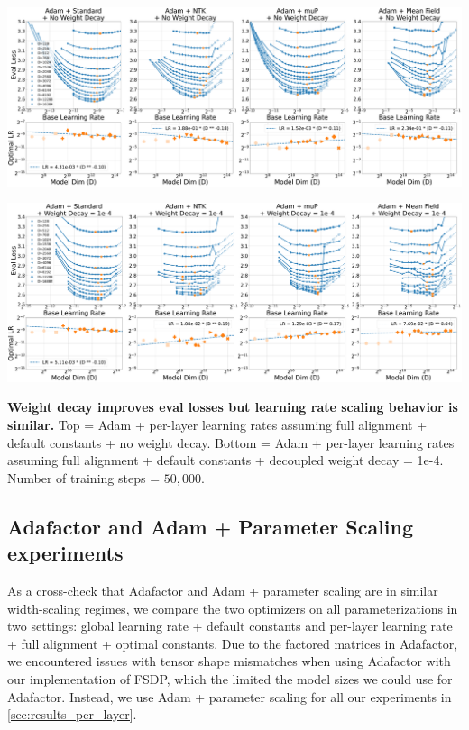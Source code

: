 \clearpage
\thispagestyle{plain}
\begin{SidewaysFigure}
        \includegraphics[width=\linewidth]{icml2024/figures/wd_appendix/adam+50k_steps_per_module_lr.pdf}
        
        \figvspace
        
        \includegraphics[width=\linewidth]{icml2024/figures/wd_appendix/adam+50k_steps_per_module_lr_wd.pdf}
        \caption{\textbf{Weight decay improves eval losses but learning rate scaling behavior is similar.} Top = Adam + per-layer learning rates assuming full alignment + default constants + no weight decay. Bottom = Adam + per-layer learning rates assuming full alignment + default constants + decoupled weight decay = 1e-4. Number of training steps = $50{,}000$.}
        \label{fig:appendix_adam_weight_decay}
\end{SidewaysFigure}
\clearpage

        
        

\subsection{Adafactor and Adam + Parameter Scaling experiments}
\label{app:adafactor_adam_ps}
As a cross-check that Adafactor and Adam + parameter scaling are in similar width-scaling regimes, we compare the two optimizers on all parameterizations in two settings: global learning rate + default constants and per-layer learning rate + full alignment + optimal constants. Due to the factored matrices in Adafactor, we encountered issues with tensor shape mismatches when using Adafactor with our implementation of FSDP, which the limited the model sizes we could use for Adafactor. Instead, we use Adam + parameter scaling for all our experiments in \cref{sec:results_per_layer}.

